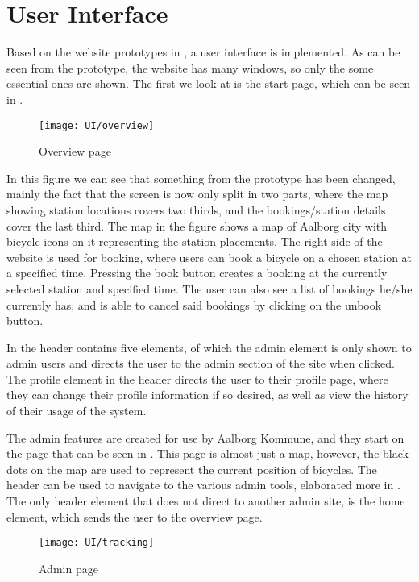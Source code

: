 \section{User Interface}
Based on the website prototypes in , a user interface is implemented.
As can be seen from the prototype, the website has many windows, so only the some essential ones are shown.
The first we look at is the start page, which can be seen in .

\begin{figure}[h]
	\centering
	\texttt{[image: UI/overview]}
	\caption{Overview page}\label{fig:UI-overview}
\end{figure}

In this figure we can see that something from the prototype has been changed, mainly the fact that the screen is now only split in two parts, where the map showing station locations covers two thirds, and the bookings/station details cover the last third.
The map in the figure shows a map of Aalborg city with bicycle icons on it representing the station placements.
The right side of the website is used for booking, where users can book a bicycle on a chosen station at a specified time.
Pressing the book button creates a booking at the currently selected station and specified time.
The user can also see a list of bookings he/she currently has, and is able to cancel said bookings by clicking on the unbook button.

In  the header contains five elements, of which the admin element is only shown to admin users and directs the user to the admin section of the site when clicked.
The profile element in the header directs the user to their profile page, where they can change their profile information if so desired, as well as view the history of their usage of the system.


The admin features are created for use by Aalborg Kommune, and they start on the page that can be seen in .
This page is almost just a map, however, the black dots on the map are used to represent the current position of bicycles.
The header can be used to navigate to the various admin tools, elaborated more in .
The only header element that does not direct to another admin site, is the home element, which sends the user to the overview page.

\begin{figure}[h]
	\centering
	\texttt{[image: UI/tracking]}
	\caption{Admin page}\label{fig:UI-admin}
\end{figure}
